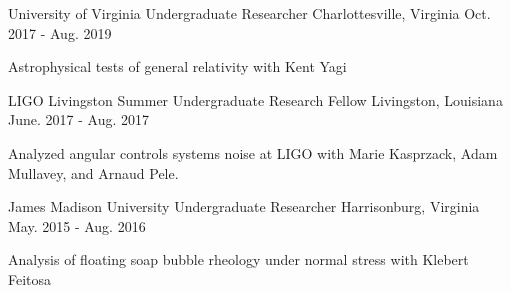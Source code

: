 

\begin{cventries}

  \cventry
    {University of Virginia} %
    {Undergraduate Researcher} %
    {Charlottesville, Virginia} %
    {Oct. 2017 - Aug. 2019} %
    {
      \begin{cvitems} %
        \item {Astrophysical tests of general relativity with Kent Yagi}
      \end{cvitems}
    }

  \cventry
    {LIGO Livingston} %
    {Summer Undergraduate Research Fellow} %
    {Livingston, Louisiana} %
    {June. 2017 - Aug. 2017 } %
    {
      \begin{cvitems} %
        \item {Analyzed angular controls systems noise at LIGO with Marie Kasprzack, Adam Mullavey, and Arnaud Pele.}
      \end{cvitems}
    }

  \cventry
    {James Madison University} %
    {Undergraduate Researcher} %
    {Harrisonburg, Virginia} %
    {May. 2015 - Aug. 2016 } %
    {
      \begin{cvitems} %
        \item {Analysis of floating soap bubble rheology under normal stress with Klebert Feitosa}
      \end{cvitems}
    }

\end{cventries}
